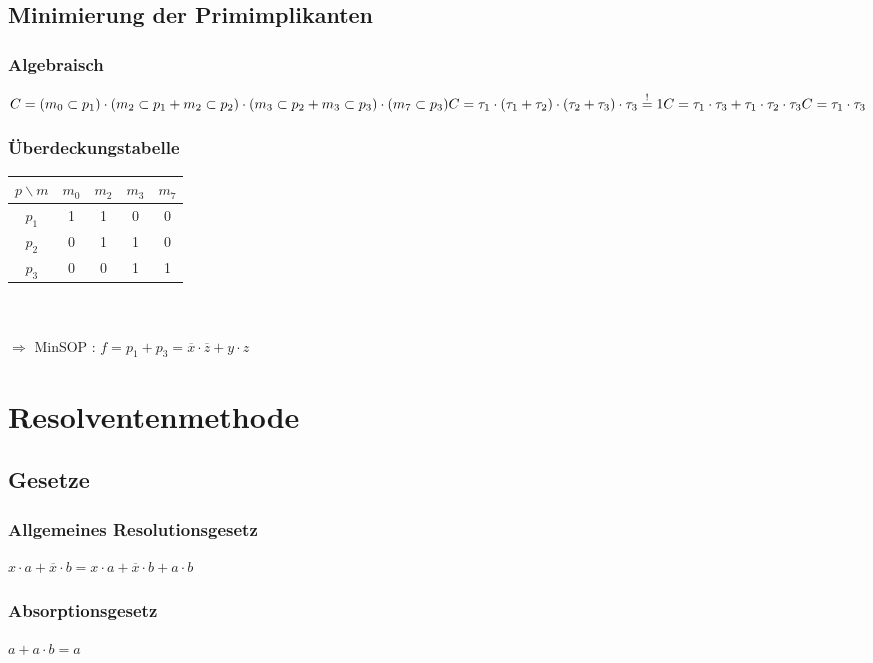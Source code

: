 \documentclass[a4paper,twocolumn,10pt]{article}
\newcommand{\sollsein}{\stackrel{!}{=}}
\begin{document}
\subsection*{Minimierung der Primimplikanten}
\subsubsection*{Algebraisch}
$C=(m_0\subset p_1)\cdot(m_2\subset p_1+m_2\subset p_2)\cdot(m_3\subset p_2+m_3\subset p_3)\cdot(m_7\subset p_3)
\\C=\tau_1\cdot(\tau_1+\tau_2)\cdot(\tau_2+\tau_3)\cdot\tau_3\sollsein 1
\\C=\tau_1\cdot\tau_3+\tau_1\cdot\tau_2\cdot\tau_3
\\C=\tau_1\cdot\tau_3\\$

\subsubsection*{Überdeckungstabelle}
\begin{tabular}{|c|c|c|c|c|}
\hline $p \backslash m$ & $m_0$ & $m_2$ & $m_3$ & $m_7$ \\ 
\hline $p_1$ & \cellcolor{tblgray}1 & \cellcolor{tblgray}1 & 0 & 0 \\ 
$p_2$ & 0 & 1 & 1 & 0 \\ 
$p_3$ & 0 & 0 & \cellcolor{tblgray}1 & \cellcolor{tblgray}1 \\ 
\hline 
\end{tabular}\\\\
$\Rightarrow$ MinSOP : $f=p_1+p_3=\overline{x}\cdot\overline{z}+y\cdot z$

\section*{Resolventenmethode}
\subsection*{Gesetze}
\subsubsection*{Allgemeines Resolutionsgesetz}
$x\cdot a + \overline{x}\cdot b=x\cdot a + \overline{x}\cdot b + a\cdot b$

\subsubsection*{Absorptionsgesetz}
$a+a\cdot b=a$\\
\end{document}
